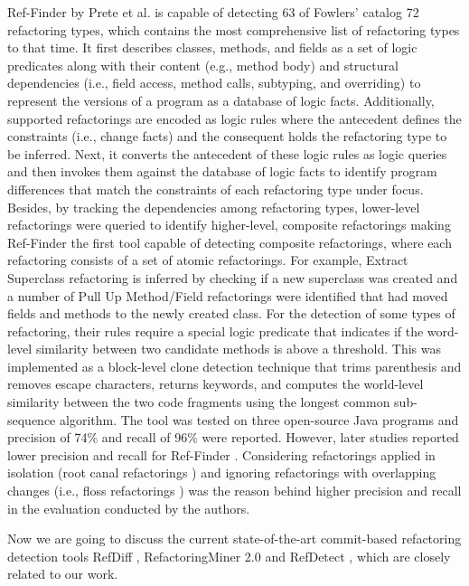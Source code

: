 \documentclass[letterpaper,12pt,onecolumn,final]{report}
\begin{document}
Ref-Finder \cite{Kim2010} by Prete et al. \cite{Prete2010} is capable of detecting 63 of Fowlers' catalog \cite{Fowler1999} 72 refactoring types, which contains the most comprehensive list of refactoring types to that time. It first describes classes, methods, and fields as a set of logic predicates along with their content (e.g., method body) and structural dependencies (i.e., field access, method calls, subtyping, and overriding) to represent the versions of a program as a database of logic facts. Additionally, supported refactorings are encoded as logic rules where the antecedent defines the constraints (i.e., change facts) and the consequent holds the refactoring type to be inferred. Next, it converts the antecedent of these logic rules as logic queries and then invokes them against the database of logic facts to identify program differences that match the constraints of each refactoring type under focus. Besides, by tracking the dependencies among refactoring types, lower-level refactorings were queried to identify higher-level, composite refactorings making Ref-Finder the first tool capable of detecting composite refactorings, where each refactoring consists of a set of atomic refactorings. For example, Extract Superclass refactoring is inferred by checking if a new superclass was created and a number of Pull Up Method/Field refactorings were identified that had moved fields and methods to the newly created class. For the detection of some types of refactoring, their rules require a special logic predicate that indicates if the word-level similarity between two candidate methods is above a threshold. This was implemented as a block-level clone detection technique that trims parenthesis and removes escape characters, returns keywords, and computes the world-level similarity between the two code fragments using the longest common sub-sequence algorithm. The tool was tested on three open-source Java programs and precision of 74\% and recall of 96\% were reported. However, later studies reported lower precision and recall for Ref-Finder \cite{Soares2013} \cite{Silva2017} \cite{Tan2019}. Considering refactorings applied in isolation (root canal refactorings \cite{MurphyHill2012}) and ignoring refactorings with overlapping changes (i.e., floss refactorings \cite{MurphyHill2012}) was the reason behind higher precision and recall in the evaluation conducted by the authors.

Now we are going to discuss the current state-of-the-art commit-based refactoring detection tools RefDiff \cite{Silva2020}, RefactoringMiner 2.0 \cite{Tsantalis2020} and RefDetect \cite{Moghadam2021}, which are closely related to our work.
\end{document}
